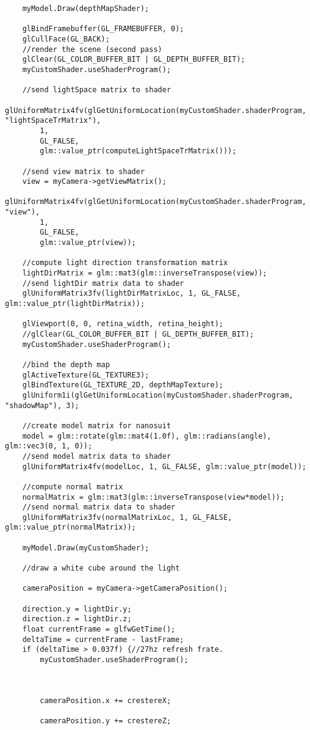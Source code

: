 \begin{itemize}
\begin{verbatim}
	myModel.Draw(depthMapShader);

	glBindFramebuffer(GL_FRAMEBUFFER, 0);
	glCullFace(GL_BACK);
	//render the scene (second pass)
	glClear(GL_COLOR_BUFFER_BIT | GL_DEPTH_BUFFER_BIT);
	myCustomShader.useShaderProgram();

	//send lightSpace matrix to shader
	glUniformMatrix4fv(glGetUniformLocation(myCustomShader.shaderProgram, "lightSpaceTrMatrix"),
		1,
		GL_FALSE,
		glm::value_ptr(computeLightSpaceTrMatrix()));

	//send view matrix to shader
	view = myCamera->getViewMatrix();
	glUniformMatrix4fv(glGetUniformLocation(myCustomShader.shaderProgram, "view"),
		1,
		GL_FALSE,
		glm::value_ptr(view));	

	//compute light direction transformation matrix
	lightDirMatrix = glm::mat3(glm::inverseTranspose(view));
	//send lightDir matrix data to shader
	glUniformMatrix3fv(lightDirMatrixLoc, 1, GL_FALSE, glm::value_ptr(lightDirMatrix));

	glViewport(0, 0, retina_width, retina_height);
	//glClear(GL_COLOR_BUFFER_BIT | GL_DEPTH_BUFFER_BIT);
	myCustomShader.useShaderProgram();

	//bind the depth map
	glActiveTexture(GL_TEXTURE3);
	glBindTexture(GL_TEXTURE_2D, depthMapTexture);
	glUniform1i(glGetUniformLocation(myCustomShader.shaderProgram, "shadowMap"), 3);
	
	//create model matrix for nanosuit
	model = glm::rotate(glm::mat4(1.0f), glm::radians(angle), glm::vec3(0, 1, 0));
	//send model matrix data to shader	
	glUniformMatrix4fv(modelLoc, 1, GL_FALSE, glm::value_ptr(model));

	//compute normal matrix
	normalMatrix = glm::mat3(glm::inverseTranspose(view*model));
	//send normal matrix data to shader
	glUniformMatrix3fv(normalMatrixLoc, 1, GL_FALSE, glm::value_ptr(normalMatrix));

	myModel.Draw(myCustomShader);
		
	//draw a white cube around the light

	cameraPosition = myCamera->getCameraPosition();
	
	direction.y = lightDir.y;
	direction.z = lightDir.z;
	float currentFrame = glfwGetTime();
	deltaTime = currentFrame - lastFrame;
	if (deltaTime > 0.037f) {//27hz refresh frate.
		myCustomShader.useShaderProgram();
		

		
		cameraPosition.x += crestereX;
	
		cameraPosition.y += crestereZ;


\end{verbatim}
\end{itemize}
